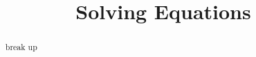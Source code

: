 \documentclass{ximera}
\title{Solving Equations}
\begin{document}
\begin{abstract}
break up
\end{abstract}
\maketitle
\end{document}

